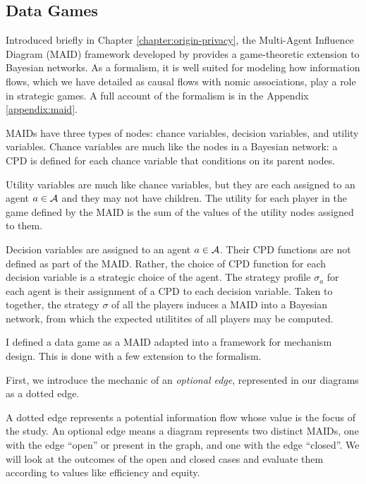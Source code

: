 \documentclass[../thesis.tex]{subfiles}
\begin{document}
\subsection{Data Games}
\label{sec:data-games}

Introduced briefly in Chapter \ref{chapter:origin-privacy}, the Multi-Agent Influence Diagram
(MAID) framework developed by \citet{koller2003multi} provides
a game-theoretic extension to Bayesian networks.
As a formalism, it is well suited for modeling how
information flows, which we have detailed as causal
flows with nomic associations, play a role in strategic
games.
A full account of the formalism is in the
Appendix \ref{appendix:maid}.

MAIDs have three types of nodes: chance variables,
decision variables, and utility variables.
Chance variables are much like the nodes in a Bayesian
network: a CPD is defined for each chance variable
that conditions on its parent nodes.

Utility variables are much like chance variables,
but they are each assigned to an agent $a \in \mathcal{A}$
and they may not have children.
The utility for each player in the game defined by
the MAID is the sum of the values of the utility
nodes assigned to them.

Decision variables are assigned to an agent $a \in \mathcal{A}$.
Their CPD functions are not defined as part of the MAID.
Rather, the choice of CPD function for each decision variable
is a strategic choice of the agent. The strategy profile $\sigma_a$
for each agent is their assignment of a CPD to each decision variable.
Taken to together, the strategy $\sigma$ of all the players
induces a MAID into a Bayesian network, from which the
expected utilitites of all players may be computed.

I defined a data game as a MAID adapted into a framework
for mechanism design. This is done with a few extension
to the formalism.

First, we introduce the mechanic of an \emph{optional edge},
represented in our diagrams as a dotted edge.
\begin{center}
\end{center}
A dotted edge represents a potential information flow
whose value is the focus of the study.
An optional edge means a diagram represents two
distinct MAIDs, one with the edge ``open'' or present
in the graph, and one with the edge ``closed''.
We will look at the outcomes of the open and closed
cases and evaluate them
according to values like efficiency and equity.
\end{document}
